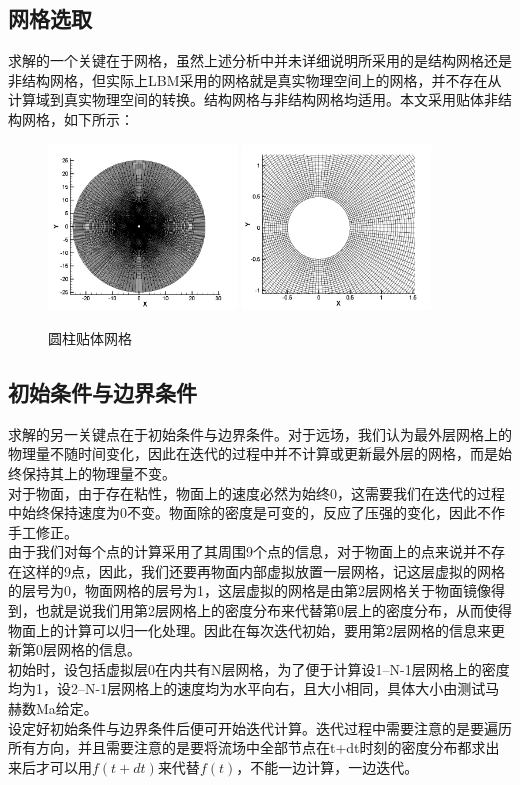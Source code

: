 \documentclass[UTF8]{ctexart}
\begin{document}
\subsection{网格选取}
求解的一个关键在于网格，虽然上述分析中并未详细说明所采用的是结构网格还是非结构网格，但实际上LBM采用的网格就是真实物理空间上的网格，并不存在从计算域到真实物理空间的转换。结构网格与非结构网格均适用。本文采用贴体非结构网格，如下所示：
\begin{figure}[htbp]\centering
\includegraphics[width=5cm]{../pic/mesh.jpg}
\includegraphics[width=5cm]{../pic/mesh_local.PNG}
\caption{圆柱贴体网格}
\end{figure}

\subsection{初始条件与边界条件}
\indent 求解的另一关键点在于初始条件与边界条件。对于远场，我们认为最外层网格上的物理量不随时间变化，因此在迭代的过程中并不计算或更新最外层的网格，而是始终保持其上的物理量不变。\\
\indent 对于物面，由于存在粘性，物面上的速度必然为始终0，这需要我们在迭代的过程中始终保持速度为0不变。物面除的密度是可变的，反应了压强的变化，因此不作手工修正。\\
\indent 由于我们对每个点的计算采用了其周围9个点的信息，对于物面上的点来说并不存在这样的9点，因此，我们还要再物面内部虚拟放置一层网格，记这层虚拟的网格的层号为0，物面网格的层号为1，这层虚拟的网格是由第2层网格关于物面镜像得到，也就是说我们用第2层网格上的密度分布来代替第0层上的密度分布，从而使得物面上的计算可以归一化处理。因此在每次迭代初始，要用第2层网格的信息来更新第0层网格的信息。\\
\indent 初始时，设包括虚拟层0在内共有N层网格，为了便于计算设1--N-1层网格上的密度均为1，设2--N-1层网格上的速度均为水平向右，且大小相同，具体大小由测试马赫数Ma给定。\\
\indent 设定好初始条件与边界条件后便可开始迭代计算。迭代过程中需要注意的是要遍历所有方向，并且需要注意的是要将流场中全部节点在t+dt时刻的密度分布都求出来后才可以用$f(t+dt)$来代替$f(t)$，不能一边计算，一边迭代。
\end{document}
